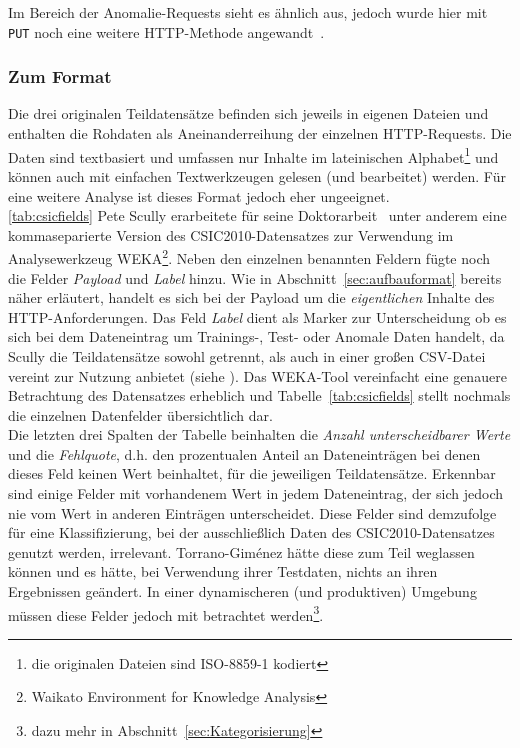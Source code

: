 

Im Bereich der Anomalie-Requests sieht es ähnlich aus, jedoch wurde hier mit \verb=PUT= noch eine weitere HTTP-Methode angewandt~\cite{csic2010}. 

\subsubsection{Zum Format}

Die drei originalen Teildatensätze befinden sich jeweils in eigenen Dateien und enthalten die Rohdaten als Aneinanderreihung der einzelnen HTTP-Requests. Die Daten sind textbasiert und umfassen nur Inhalte im lateinischen Alphabet\footnote{die originalen Dateien sind ISO-8859-1 kodiert} und können auch mit einfachen Textwerkzeugen gelesen (und bearbeitet) werden. Für eine weitere Analyse ist dieses Format jedoch eher ungeeignet.\\ \ref{tab:csicfields}     Pete Scully erarbeitete für seine Doktorarbeit~\cite{Scully2016} unter anderem eine kommaseparierte Version des CSIC2010-Datensatzes zur Verwendung im  Analysewerkzeug WEKA\footnote{Waikato Environment for Knowledge Analysis}. Neben den einzelnen benannten Feldern fügte noch die Felder \emph{Payload} und \emph{Label} hinzu. Wie in Abschnitt~\ref{sec:aufbauformat} bereits näher erläutert, handelt es sich bei der Payload um die \emph{eigentlichen} Inhalte des HTTP-Anforderungen. Das Feld \emph{Label} dient als Marker zur Unterscheidung ob es sich bei dem Dateneintrag um Trainings-, Test- oder Anomale Daten handelt, da Scully die Teildatensätze sowohl getrennt, als auch in einer großen CSV-Datei vereint zur Nutzung anbietet (siehe \cite{csiccsv2010}). Das WEKA-Tool vereinfacht eine genauere Betrachtung des Datensatzes erheblich und Tabelle~\ref{tab:csicfields} stellt nochmals die einzelnen Datenfelder übersichtlich dar.\\

Die letzten drei Spalten der Tabelle beinhalten die \emph{Anzahl unterscheidbarer Werte} und die \emph{Fehlquote}, d.h. den prozentualen Anteil an Dateneinträgen bei denen dieses Feld keinen Wert beinhaltet, für die jeweiligen Teildatensätze. Erkennbar sind einige Felder mit vorhandenem Wert in jedem Dateneintrag, der sich jedoch nie vom Wert in anderen Einträgen unterscheidet. Diese Felder sind demzufolge für eine Klassifizierung, bei der ausschließlich Daten des CSIC2010-Datensatzes genutzt werden, irrelevant. Torrano-Giménez hätte diese zum Teil weglassen können und es hätte, bei Verwendung ihrer Testdaten, nichts an ihren Ergebnissen geändert. In einer dynamischeren (und produktiven) Umgebung müssen diese Felder jedoch mit betrachtet werden\footnote{dazu mehr in Abschnitt~\ref{sec:Kategorisierung}}.\\

